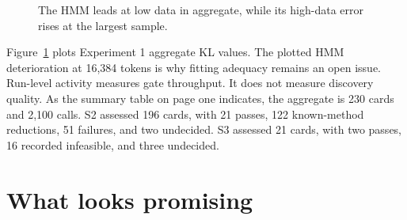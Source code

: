 \begin{figure}[ht]
\centering
{}
\caption{The HMM leads at low data in aggregate, while its high-data error rises at the largest sample.}
\label{fig:exp1}
\end{figure}

Figure~\ref{fig:exp1} plots Experiment 1 aggregate KL values. The plotted HMM deterioration at 16,384 tokens is why fitting adequacy remains an open issue. Run-level activity measures gate throughput. It does not measure discovery quality. As the summary table on page one indicates, the aggregate is 230 cards and 2,100 calls. S2 assessed 196 cards, with 21 passes, 122 known-method reductions, 51 failures, and two undecided. S3 assessed 21 cards, with two passes, 16 recorded infeasible, and three undecided.

\section{What looks promising}

